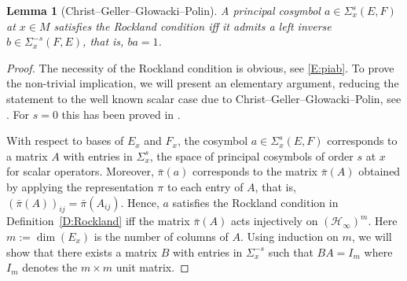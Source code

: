 \documentclass[reqno,12pt]{amsart}
\theoremstyle{plain}
\newtheorem{lemma}[theorem]{Lemma}
\theoremstyle{definition}
\begin{document}
\begin{lemma}[Christ--Geller--G{\l}owacki--Polin]\label{L:Rockland}
A principal cosymbol $a\in\Sigma_x^s(E,F)$ at $x\in M$ satisfies the Rockland condition iff it admits a left inverse $b\in\Sigma_x^{-s}(F,E)$, that is, $ba=1$.
\end{lemma}


\begin{proof}
The necessity of the Rockland condition is obvious, see \eqref{E:piab}.
To prove the non-trivial implication, we will present an elementary argument, reducing the statement to the well known scalar case due to Christ--Geller--G{\l}owacki--Polin, see \cite[Theorem~6.2]{CGGP92}.
For $s=0$ this has been proved in \cite{G91}.


With respect to bases of $E_x$ and $F_x$, the cosymbol $a\in\Sigma^s_x(E,F)$ corresponds to a matrix $A$ with entries in $\Sigma^s_x$, the space of principal cosymbols of order $s$ at $x$ for scalar operators.
Moreover, $\bar\pi(a)$ corresponds to the matrix $\bar\pi(A)$ obtained by applying the representation $\pi$ to each entry of $A$, that is, $(\bar\pi(A))_{ij}=\bar\pi(A_{ij})$.
Hence, $a$ satisfies the Rockland condition in Definition~\ref{D:Rockland} iff the matrix $\bar\pi(A)$ acts injectively on $(\mathcal H_\infty)^m$.
Here $m:=\dim(E_x)$ is the number of columns of $A$.
Using induction on $m$, we will show that there exists a matrix $B$ with entries in $\Sigma^{-s}_x$ such that $BA=I_m$ where $I_m$ denotes the $m\times m$ unit matrix.



\end{proof}
\end{document}
